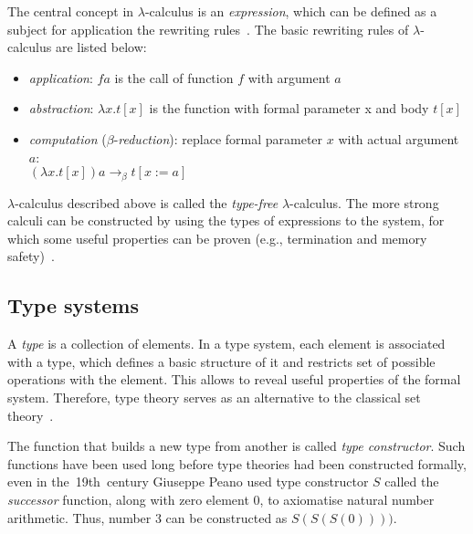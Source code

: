 \documentclass[article]{aaltoseries}
\begin{document}
The central concept in $\lambda$-calculus is an \textit{expression}, which can be defined as a subject for application the rewriting rules~\cite{Bar88}. The basic rewriting rules of $\lambda$-calculus are listed below:

\begin{itemize}
\itemsep0em
	\item \textit{application}:
	$f a$ is the call of function $f$ with argument $a$
	
	\item \textit{abstraction}:
	$\lambda x.t[x]$ is the function with formal parameter x and body $t[x]$
	
	\item \textit{computation} ($\beta$-\textit{reduction}): replace formal parameter $x$ with actual argument $a$: \\
	$(\lambda x.t[x]) a \rightarrow_{\beta} t[x:=a]$
\end{itemize}

$\lambda$-calculus described above is called the \textit{type-free} $\lambda$-calculus. The more strong calculi can be constructed by using the types of expressions to the system, for which some useful properties can be proven (e.g., termination and memory safety)~\cite{Bar13}.

\subsection{Type systems}
\label{sec:type_systems}


A \textit{type} is a collection of elements. In a type system, each element is associated with a type, which defines a basic structure of it and restricts set of possible operations with the element. This allows to reveal useful properties of the formal system. Therefore, type theory serves as an alternative to the classical set theory~\cite{Tho91}.

The function that builds a new type from another is called \textit{type constructor}. Such functions have been used long before type theories had been constructed formally, even in the~19th~century Giuseppe Peano used type constructor $S$ called the \textit{successor} function, along with zero element 0, to axiomatise natural number arithmetic. Thus, number 3 can be constructed as $S(S(S(0))))$.
\end{document}
